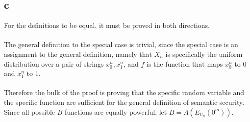 \documentclass[letterpaper,notitlepage,twoside]{article}
\begin{document}
\subsection*{c}
For the definitions to be equal, it must be proved in both directions.\\\\
The general definition to the special case is trivial, since the special case is an assignment to the general definition, namely that $X_n$ is specifically the uniform distribution over a pair of strings $x_0^n, x_1^n$, and $f$ is the function that maps $x_0^n$ to $0$ and $x_1^n$ to $1$.\\\\
Therefore the bulk of the proof is proving that the specific random variable and the specific function are sufficient for the general definition of semantic security. Since all possible $B$ functions are equally powerful, let $B = A(E_{U_n}(0^m))$.
\end{document}

